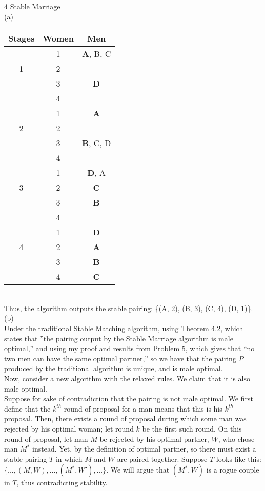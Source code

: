 \documentclass{article}
\begin{document}
{\Large 4 Stable Marriage} \\[.5cm]
(a)\\[.3cm]
\begin{tabular}{ | c | c | c | }
\hline
Stages & Women & Men \\
\hline
& 1 & {\large\textbf{A}}, B, C \\
1 & 2 & \\
& 3 & {\large\textbf{D}} \\
& 4 & \\
\hline
& 1 & {\large\textbf{A}} \\
2 & 2 & \\
& 3 & {\large\textbf{B}}, C, D \\
& 4 & \\
\hline
& 1 & {\large\textbf{D}}, A \\
3 & 2 & {\large\textbf{C}}\\
& 3 & {\large\textbf{B}} \\
& 4 & \\
\hline
& 1 & {\large\textbf{D}} \\
4 & 2 & {\large\textbf{A}} \\
& 3 & {\large\textbf{B}} \\
& 4 & {\large\textbf{C}} \\
\hline
\end{tabular}\\[.3cm]
Thus, the algorithm outputs the stable pairing: \{(A, 2), (B, 3), (C, 4), (D, 1)\}.\\[.5cm]
(b) \\[.3cm]
\indent Under the traditional Stable Matching algorithm, using Theorem 4.2, which states that ''the pairing output by the Stable Marriage algorithm is male optimal,'' and using my proof and results from Problem 5, which gives that ``no two men can have the same optimal partner,'' so we have that the pairing $P$ produced by the traditional algorithm is unique, and is male optimal.\\[.2cm]
\indent Now, consider a new algorithm with the relaxed rules. We claim that it is also male optimal.\\[.2cm]
\indent Suppose for sake of contradiction that the pairing is not male optimal. We first define that the $k^{th}$ round of proposal for a man means that this is his $k^{th}$ proposal. Then, there exists a round of proposal during which some man was rejected by his optimal woman; let round $k$ be the first such round. On this round of proposal, let man $M$ be rejected by his optimal partner, $W$, who chose man $M^*$ instead. Yet, by the definition of optimal partner, so there must exist a stable pairing $T$ in which $M$ and $W$ are paired together. Suppose $T$ looks like this: $\{..., (M, W), ..., (M^*, W'), ...\}.$ We will argue that $(M^*, W)$ is a rogue couple in $T$, thus contradicting stability.\\[.2cm]
\end{document}
